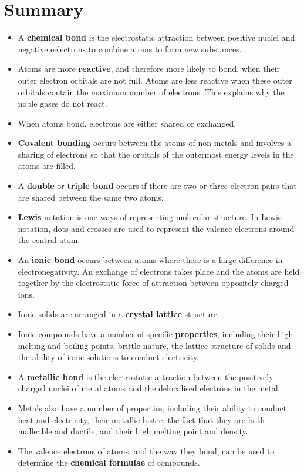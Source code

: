             \section{Summary}
            \nopagebreak
      \label{m38689*id147386}\begin{itemize}[noitemsep]
            \label{m38689*uid136}\item A \textbf{chemical bond} is the electrostatic attraction between positive nuclei and negative eelectrons to combine atoms to form new substances.
\label{m38689*uid137}\item Atoms are more \textbf{reactive}, and therefore more likely to bond, when their outer electron orbitals are not full. Atoms are less reactive when these outer orbitals contain the maximum number of electrons. This explains why the noble gases do not react.
\label{m38689*uid142}\item When atoms bond, electrons are either shared or exchanged.
\label{m38689*uid143}\item \textbf{Covalent bonding} occurs between the atoms of non-metals and involves a sharing of electrons so that the orbitals of the outermost energy levels in the atoms are filled.
\label{m38689*uid145}\item A \textbf{double} or \textbf{triple bond} occurs if there are two or three electron pairs that are shared between the same two atoms.
\label{m38689*uid147}\item \textbf{Lewis} notation is one ways of representing molecular structure. In Lewis notation, dots and crosses are used to represent the valence electrons around the central atom.
\label{m38689*uid150}\item An \textbf{ionic bond} occurs between atoms where there is a large difference in electronegativity. An exchange of electrons takes place and the atoms are held together by the electrostatic force of attraction between oppositely-charged ions.
\label{m38689*uid151}\item Ionic solids are arranged in a \textbf{crystal lattice} structure.
\label{m38689*uid152}\item Ionic compounds have a number of specific \textbf{properties}, including their high melting and boiling points, brittle nature, the lattice structure of solids and the ability of ionic solutions to conduct electricity.
\label{m38689*uid153}\item A \textbf{metallic bond} is the electrostatic attraction between the positively charged nuclei of metal atoms and the delocalised electrons in the metal.
\label{m38689*uid154}\item Metals also have a number of properties, including their ability to conduct heat and electricity, their metallic lustre, the fact that they are both malleable and ductile, and their high melting point and density.
\label{m38689*uid155}\item The valence electrons of atoms, and the way they bond, can be used to determine the \textbf{chemical formulae} of compounds.
\end{itemize}
